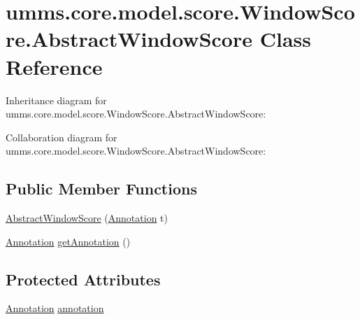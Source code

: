 \hypertarget{classumms_1_1core_1_1model_1_1score_1_1_window_score_1_1_abstract_window_score}{\section{umms.\+core.\+model.\+score.\+Window\+Score.\+Abstract\+Window\+Score Class Reference}
\label{classumms_1_1core_1_1model_1_1score_1_1_window_score_1_1_abstract_window_score}
}


Inheritance diagram for umms.\+core.\+model.\+score.\+Window\+Score.\+Abstract\+Window\+Score\+:


Collaboration diagram for umms.\+core.\+model.\+score.\+Window\+Score.\+Abstract\+Window\+Score\+:
\subsection*{Public Member Functions}
\begin{DoxyCompactItemize}
\item 
\hyperlink{classumms_1_1core_1_1model_1_1score_1_1_window_score_1_1_abstract_window_score_ace983c7bf2038ac16a8af9232f5d9d8b}{Abstract\+Window\+Score} (\hyperlink{interfaceumms_1_1core_1_1annotation_1_1_annotation}{Annotation} t)
\item 
\hyperlink{interfaceumms_1_1core_1_1annotation_1_1_annotation}{Annotation} \hyperlink{classumms_1_1core_1_1model_1_1score_1_1_window_score_1_1_abstract_window_score_a1005010d00c6d09f70b39da815c3ee38}{get\+Annotation} ()
\end{DoxyCompactItemize}
\subsection*{Protected Attributes}
\begin{DoxyCompactItemize}
\item 
\hyperlink{interfaceumms_1_1core_1_1annotation_1_1_annotation}{Annotation} \hyperlink{classumms_1_1core_1_1model_1_1score_1_1_window_score_1_1_abstract_window_score_a455fb02f18f492e611113b9da0a24888}{annotation}
\end{DoxyCompactItemize}


